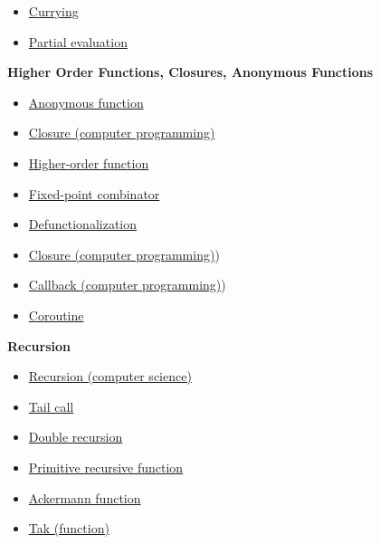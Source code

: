 \documentclass[11pt]{article}
\begin{document}
\begin{itemize}
\item \href{https://en.wikipedia.org/wiki/Currying}{Currying}
\item \href{https://en.wikipedia.org/wiki/Partial_evaluation}{Partial evaluation}
\end{itemize}

\textbf{Higher Order Functions, Closures, Anonymous Functions}

\begin{itemize}
\item \href{https://en.wikipedia.org/wiki/Anonymous_function}{Anonymous function}
\item \href{https://en.wikipedia.org/wiki/Closure_\%28computer_programming\%29}{Closure (computer programming)}
\item \href{https://en.wikipedia.org/wiki/Higher-order_function}{Higher-order function}
\item \href{https://en.wikipedia.org/wiki/Fixed-point_combinator}{Fixed-point combinator}
\item \href{https://en.wikipedia.org/wiki/Defunctionalization}{Defunctionalization}

\item \href{http://en.wikipedia.org/wiki/Closure_(computer_programming}{Closure (computer programming)})
\item \href{http://en.wikipedia.org/wiki/Callback_(computer_programming}{Callback (computer programming)})
\item \href{http://en.wikipedia.org/wiki/Coroutine}{Coroutine}
\end{itemize}


\textbf{Recursion}

\begin{itemize}
\item \href{https://en.wikipedia.org/wiki/Recursion_\%28computer_science\%29}{Recursion (computer science)}
\item \href{https://en.wikipedia.org/wiki/Tail_call}{Tail call}
\item \href{https://en.wikipedia.org/wiki/Double_recursion}{Double recursion}
\item \href{https://en.wikipedia.org/wiki/Primitive_recursive_function}{Primitive recursive function}
\end{itemize}


\begin{itemize}
\item \href{https://en.wikipedia.org/wiki/Ackermann_function}{Ackermann function}
\item \href{https://en.wikipedia.org/wiki/Tak_\%28function\%29}{Tak (function)}
\end{itemize}
\end{document}
